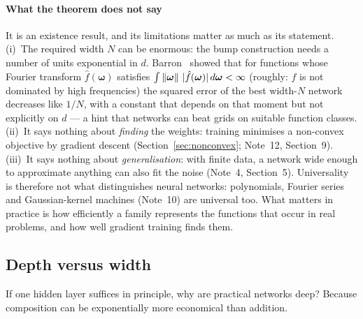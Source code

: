 \documentclass[11pt]{article}
\begin{document}
\paragraph{What the theorem does not say} It is an existence result, and its limitations matter as much as its
statement. (i)~The required width $N$ can be enormous: the bump construction needs a number of units exponential in $d$.
Barron~\cite{barron1993} showed that for functions whose Fourier transform $\hat f(\boldsymbol\omega)$ satisfies $\int\left\lVert \boldsymbol\omega \right\rVert\,|\hat
f(\boldsymbol\omega)|\,d\boldsymbol\omega < \infty$ (roughly: $f$ is not dominated by high frequencies) the squared error
of the best width-$N$ network decreases like $1/N$, with a constant that depends on that moment but not explicitly on
$d$ --- a hint that networks can beat grids on suitable function classes. (ii)~It says nothing about
\emph{finding} the weights: training minimises a non-convex objective by gradient descent (Section~\ref{sec:nonconvex};
Note~12, Section~9). (iii)~It says nothing about \emph{generalisation}: with finite data, a network wide enough to approximate
anything can also fit the noise (Note~4, Section~5). Universality is therefore not what distinguishes neural networks:
polynomials, Fourier series and Gaussian-kernel machines (Note~10) are universal too. What matters in practice is how
efficiently a family represents the functions that occur in real problems, and how well gradient training finds them.

\subsection{Depth versus width}\label{sec:depth}

If one hidden layer suffices in principle, why are practical networks deep? Because composition can be exponentially
more economical than addition.
\end{document}
